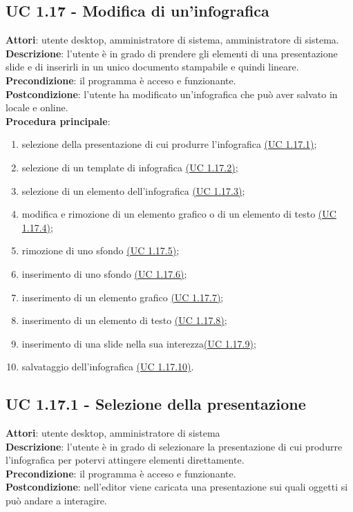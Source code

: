 \subsection{UC 1.17 - Modifica di un'infografica}{
	\label{uc1.17}
	\textbf{Attori}: utente desktop, amministratore di sistema, amministratore di sistema. \\
	\textbf{Descrizione}: l'utente è in grado di prendere gli elementi di una presentazione slide e di inserirli in un unico documento stampabile e quindi lineare. \\
	\textbf{Precondizione}: il programma è acceso e funzionante.	\\
	\textbf{Postcondizione}: l'utente ha modificato un'infografica che può aver salvato in locale e online.	\\
	\textbf{Procedura principale}:
	\begin{enumerate}
		\item selezione della presentazione di cui produrre l’infografica \hyperref[uc1.17.1]{(UC 1.17.1)};
		\item selezione di un template di infografica \hyperref[uc1.17.2]{(UC 1.17.2)};
		\item selezione di un elemento dell’infografica \hyperref[uc1.17.3]{(UC 1.17.3)};
		\item modifica e rimozione di un elemento grafico o di un elemento di testo \hyperref[uc1.17.4]{(UC 1.17.4)};
		\item rimozione di uno sfondo \hyperref[uc1.17.5]{(UC 1.17.5)};
		\item inserimento di uno sfondo \hyperref[uc1.17.6]{(UC 1.17.6)};
		\item inserimento di un elemento grafico \hyperref[uc1.17.7]{(UC 1.17.7)};
		\item inserimento di un elemento di testo \hyperref[uc1.17.8]{(UC 1.17.8)};
		\item inserimento di una slide nella sua interezza\hyperref[uc1.17.9]{(UC 1.17.9)};
		\item salvataggio dell'infografica \hyperref[uc1.17.10]{(UC 1.17.10)}.
	\end{enumerate}
	}
\subsection{UC 1.17.1 - Selezione della presentazione}{
	\label{uc1.17.1}
	\textbf{Attori}: utente desktop, amministratore di sistema \\
	\textbf{Descrizione}: l'utente è in grado di selezionare la presentazione di cui produrre l'infografica per potervi attingere elementi direttamente. \\
	\textbf{Precondizione}: il programma è acceso e funzionante.	\\
	\textbf{Postcondizione}: nell'editor viene caricata una presentazione sui quali oggetti si può andare a interagire.\\
	}
